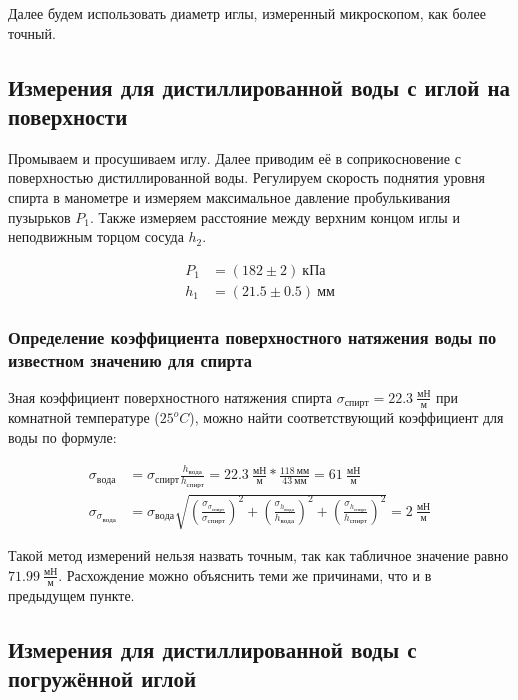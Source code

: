 \documentclass[a4paper, 12pt]{article}
\begin{document}
			Далее будем использовать диаметр иглы, измеренный микроскопом, как более точный.

		\subsection{Измерения для дистиллированной воды с иглой на поверхности}

			Промываем и просушиваем иглу. Далее приводим её в соприкосновение с поверхностью дистиллированной воды. Регулируем скорость поднятия уровня спирта в манометре и измеряем максимальное давление пробулькивания пузырьков $P_1$. Также измеряем расстояние между верхним концом иглы и неподвижным торцом сосуда $h_2$.

			\begin{align*}
				P_1 &= (182 \pm 2)~кПа\\
				h_1 &= (21.5 \pm 0.5)~мм
			\end{align*}

			\subsubsection{Определение коэффициента поверхностного натяжения воды по известном значению для спирта}

				Зная коэффициент поверхностного натяжения спирта $\sigma_{спирт} = 22.3~\frac{мН}{м}$ при комнатной температуре ($25^oC$), можно найти соответствующий коэффициент для воды по формуле:

				\begin{align*}
					\sigma_{вода} &= \sigma_{спирт} \frac{h_{вода}}{h_{спирт}} = 22.3~\frac{мН}{м} * \frac{118~мм}{43~мм} = 61~\frac{мН}{м}\\
					\sigma_{\sigma_{вода}} &= \sigma_{вода} \sqrt{\left( \frac{\sigma_{\sigma_{спирт}}}{\sigma_{спирт}} \right)^2 + \left( \frac{\sigma_{h_{вода}}}{h_{вода}} \right)^2 + \left( \frac{\sigma_{h_{спирт}}}{h_{спирт}} \right)^2} = 2~\frac{мН}{м}
				\end{align*}

				Такой метод измерений нельзя назвать точным, так как табличное значение равно $71.99~\frac{мН}{м}$. Расхождение можно объяснить теми же причинами, что и в предыдущем пункте.

		\subsection{Измерения для дистиллированной воды с погружённой иглой}
\end{document}
